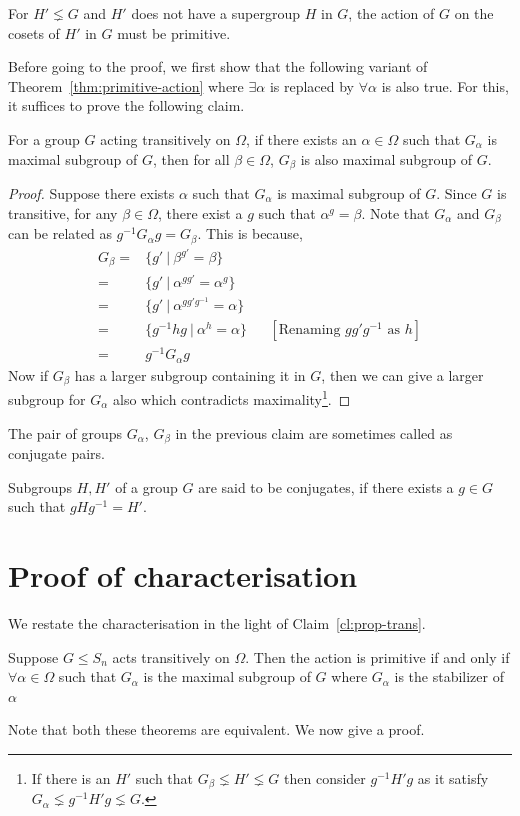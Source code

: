 \begin{corollary}
	For $H' \lneq G$ and $H'$ does not have a supergroup $H$ in $G$, the
	action of $G$ on the cosets of $H'$ in $G$ must be primitive.
\end{corollary}

Before going to the proof, we first show that the following variant of 
Theorem~\ref{thm:primitive-action} where $\exists \alpha$ is replaced by 
$\forall \alpha$ is also true. For this, it suffices to prove the following
claim.

\begin{claim}
	For a group $G$ acting transitively on $\Omega$, if there exists an
	$\alpha \in \Omega$ such that $G_\alpha$ is maximal subgroup of $G$,
	then for all $\beta \in \Omega$, $G_\beta$ is also maximal subgroup of
	$G$.
	\label{cl:prop-trans}
\end{claim}
\begin{proof}
	Suppose there exists $\alpha$ such that $G_\alpha$ is maximal subgroup
	of $G$. Since $G$ is transitive, for any $\beta \in \Omega$, there
	exist a $g$ such that $\alpha^g = \beta$. Note that $G_\alpha$ and
	$G_\beta$ can be related as $g^{-1}G_\alpha g =
	G_\beta$. This is because,
	\begin{align*}
		G_\beta  =&  \{ g' ~|~ \beta^{g'} = \beta \} \\
			= & \{ g' ~|~ \alpha^{gg'} = \alpha^g \} \\
			= & \{ g' ~|~ \alpha^{gg'g^{-1}} = \alpha \} \\
			= & \{ g^{-1} hg ~|~ \alpha^{h} = \alpha \} &&
			[\text{Renaming $gg'g^{-1}$ as $h$}] \\
			= & g^{-1}G_\alpha g
	\end{align*}
	Now if $G_\beta$ has a larger subgroup containing
	it in $G$, then we can give a larger
	subgroup for $G_\alpha$ also which contradicts maximality\footnote{ If
		there is an $H'$ such that $G_\beta \lneq H' \lneq G$ then
		consider $g^{-1}H'g$ as it satisfy $G_\alpha \lneq g^{-1}H'g
	\lneq G$.}. 
\end{proof}
The pair of groups $G_\alpha$, $G_\beta$ in the previous claim are sometimes
called as conjugate pairs.
\begin{definition}[Conjugates]
	Subgroups $H,H'$ of a group $G$ are said to be conjugates, if there 
	exists a $g \in G$ such that $gHg^{-1} =H'$.
\end{definition}

\section{Proof of characterisation}
We restate the characterisation in the light of Claim~\ref{cl:prop-trans}.
\begin{theorem}
	Suppose $G \le S_n$ acts transitively on $\Omega$. Then the action is
	primitive if and only if $\forall \alpha \in \Omega$ such that
	$G_{\alpha}$ is the maximal subgroup of $G$ where $G_\alpha$ is the
	stabilizer of $\alpha$
	\label{thm:primitive-action-strong}
\end{theorem}
Note that both these theorems are equivalent. We now give a proof.

